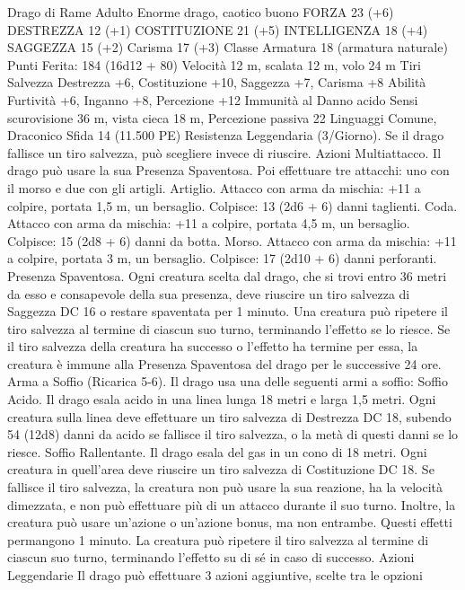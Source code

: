 \begin{multicols}{2}
Drago di Rame Adulto
Enorme drago, caotico buono
FORZA 23 (+6)
DESTREZZA 12 (+1)
COSTITUZIONE 21 (+5)
INTELLIGENZA 18 (+4)
SAGGEZZA 15 (+2)
Carisma 17 (+3)
Classe Armatura 18 (armatura naturale)
\hspace*{0pt}\hfill{Punti Ferita}: 184 (16d12 + 80)
Velocità 12 m, scalata 12 m, volo 24 m
Tiri Salvezza Destrezza +6, Costituzione +10, Saggezza +7, Carisma +8
Abilità Furtività +6, Inganno +8, Percezione +12
Immunità al Danno acido
Sensi scurovisione 36 m, vista cieca 18 m, Percezione passiva 22
Linguaggi Comune, Draconico
Sfida 14 (11.500 PE)
Resistenza Leggendaria (3/Giorno). Se il drago fallisce un tiro
salvezza, può scegliere invece di riuscire.
Azioni
Multiattacco. Il drago può usare la sua Presenza Spaventosa. Poi
effettuare tre attacchi: uno con il morso e due con gli artigli.
Artiglio. Attacco con arma da mischia: +11 a colpire, portata 1,5
m, un bersaglio.
Colpisce: 13 (2d6 + 6) danni taglienti.
Coda. Attacco con arma da mischia: +11 a colpire, portata 4,5
m, un bersaglio.
Colpisce: 15 (2d8 + 6) danni da botta.
Morso. Attacco con arma da mischia: +11 a colpire, portata 3 m,
un bersaglio.
Colpisce: 17 (2d10 + 6) danni perforanti.
Presenza Spaventosa. Ogni creatura scelta dal drago, che si trovi
entro 36 metri da esso e consapevole della sua presenza, deve
riuscire un tiro salvezza di Saggezza DC 16 o restare spaventata per
1 minuto. Una creatura può ripetere il tiro salvezza al termine di
ciascun suo turno, terminando l’effetto se lo riesce. Se il tiro salvezza
della creatura ha successo o l’effetto ha termine per essa, la creatura è
immune alla Presenza Spaventosa del drago per le successive 24 ore.
Arma a Soffio (Ricarica 5-6). Il drago usa una delle seguenti armi
a soffio:
Soffio Acido. Il drago esala acido in una linea lunga 18 metri e larga
1,5 metri. Ogni creatura sulla linea deve effettuare un tiro salvezza di
Destrezza DC 18, subendo 54 (12d8) danni da acido se fallisce il tiro
salvezza, o la metà di questi danni se lo riesce.
Soffio Rallentante. Il drago esala del gas in un cono di 18 metri. Ogni
creatura in quell’area deve riuscire un tiro salvezza di Costituzione
DC 18. Se fallisce il tiro salvezza, la creatura non può usare la sua
reazione, ha la velocità dimezzata, e non può effettuare più di un
attacco durante il suo turno. Inoltre, la creatura può usare un’azione o
un’azione bonus, ma non entrambe. Questi effetti permangono 1
minuto. La creatura può ripetere il tiro salvezza al termine di ciascun
suo turno, terminando l’effetto su di sé in caso di successo.
Azioni Leggendarie
Il drago può effettuare 3 azioni aggiuntive, scelte tra le opzioni

\end{multicols}
